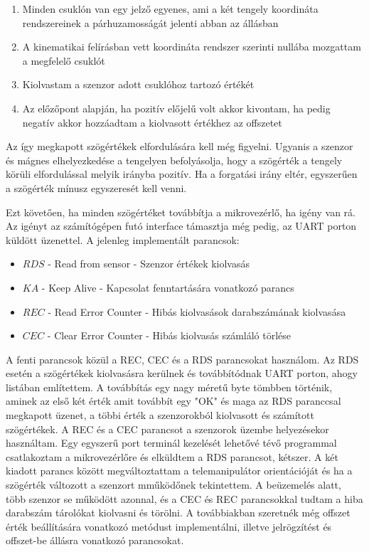 \begin{enumerate}
  \item Minden csuklón van egy jelző egyenes, ami a két tengely koordináta rendszereinek a párhuzamosságát jelenti abban az állásban
  \item A kinematikai felírásban vett koordináta rendszer szerinti nullába mozgattam a megfelelő csuklót
  \item Kiolvastam a szenzor adott csuklóhoz tartozó értékét
  \item Az előzőpont alapján, ha pozitív előjelű volt akkor kivontam, ha pedig negatív akkor hozzáadtam a kiolvasott értékhez az offszetet
\end{enumerate}

Az így megkapott szögértékek elfordulására kell még figyelni. Ugyanis a szenzor és mágnes elhelyezkedése a tengelyen befolyásolja, hogy a szögérték a tengely körüli elfordulással melyik irányba pozitív. Ha a forgatási irány eltér, egyszerűen a szögérték mínusz egyszeresét kell venni. 

Ezt követően, ha minden szögértéket továbbítja a mikrovezérlő, ha igény van rá. Az igényt az számítógépen futó interface támasztja még pedig, az UART porton küldött üzenettel. A jelenleg implementált parancsok:

\begin{itemize}
\item $RDS$ - Read from sensor - Szenzor értékek kiolvasás 
\item $KA$ - Keep Alive - Kapcsolat fenntartására vonatkozó parancs
\item $REC$ - Read Error Counter - Hibás kiolvasások darabszámának kiolvasása
\item $CEC$ - Clear Error Counter - Hibás kiolvasás számláló törlése
\end{itemize}

A fenti parancsok közül a REC, CEC és a RDS parancsokat használom. Az RDS esetén a szögértékek kiolvasásra kerülnek és továbbítódnak UART porton, ahogy listában említettem. A továbbítás egy nagy méretű byte tömbben történik, aminek az első két érték amit továbbít egy "OK" és maga az RDS paranccsal megkapott üzenet, a többi érték a szenzorokból kiolvasott és számított szögértékek. A REC és a CEC parancsot a szenzorok üzembe helyezésekor használtam. Egy egyszerű port terminál kezelését lehetővé tévő programmal csatlakoztam a mikrovezérlőre és elküldtem a RDS parancsot, kétszer. A két kiadott parancs között megváltoztattam a telemanipulátor orientációját és ha a szögérték változott a szenzort mműködőnek tekintettem. A beüzemelés alatt, több szenzor se működött azonnal, és a CEC és REC parancsokkal tudtam a hiba darabszám tárolókat kiolvasni és törölni. A továbbiakban szeretnék még offszet érték beállítására vonatkozó metódust implementálni, illetve jelrögzítést és offszet-be állásra vonatkozó parancsokat.

